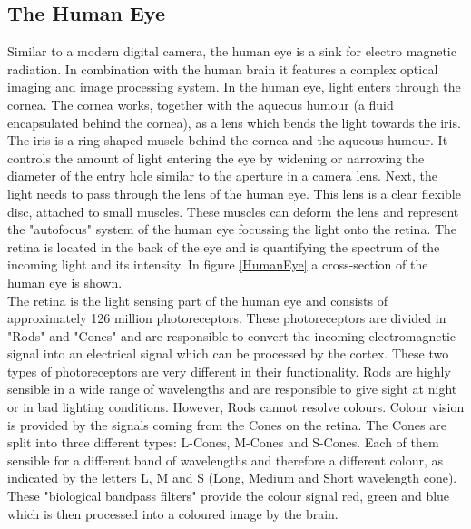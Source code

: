 \subsection{The Human Eye}
Similar to a modern digital camera, the human eye is a sink for electro magnetic radiation. In combination with the human brain it features a complex optical imaging and image processing system. In the human eye, light enters through the cornea. The cornea works, together with the aqueous humour (a fluid encapsulated behind the cornea), as a lens which bends the light towards the iris. The iris is a ring-shaped muscle behind the cornea and the aqueous humour. It controls the amount of light entering the eye by widening or narrowing the diameter of the entry hole similar to the aperture in a camera lens. Next, the light needs to pass through the lens of the human eye. This lens is a clear flexible disc, attached to small muscles. These muscles can deform the lens and represent the "autofocus" system of the human eye focussing the light onto the retina. The retina is located in the back of the eye and is quantifying the spectrum of the incoming light and its intensity. In figure \ref{HumanEye} a cross-section of the human eye is shown.\cite{Frings2019}\cite{LoefflerLang2020}\\
The retina is the light sensing part of the human eye and consists of approximately 126 million photoreceptors. These photoreceptors are divided in "Rods" and "Cones" and are responsible to convert the incoming electromagnetic signal into an electrical signal which can be processed by the cortex. These two types of photoreceptors are very different in their functionality. Rods are highly sensible in a wide range of wavelengths and are responsible to give sight at night or in bad lighting conditions. However, Rods cannot resolve colours. Colour vision is provided by the signals coming from the Cones on the retina. The Cones are split into three different types: L-Cones, M-Cones and S-Cones. Each of them sensible for a different band of wavelengths and therefore a different colour, as indicated by the letters L, M and S (Long, Medium and Short wavelength cone). These "biological bandpass filters" provide the colour signal red, green and blue which is then processed into a coloured image by the brain.\cite{SensationandPerception}\cite{Frings2019}


